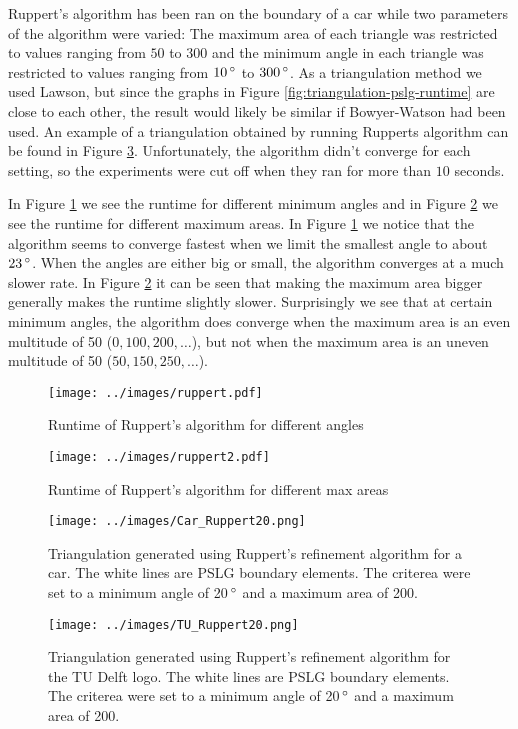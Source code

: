 Ruppert's algorithm has been ran on the boundary of a car while two parameters of the algorithm were varied:
The maximum area of each triangle was restricted to values ranging from $50$ to $300$ and
the minimum angle in each triangle was restricted to values ranging from $10\,^{\circ}$ to $300\,^{\circ}$.
As a triangulation method we used Lawson, but since the graphs in Figure \ref{fig:triangulation-pslg-runtime} are close to each other, the result would likely be similar if Bowyer-Watson had been used.
An example of a triangulation obtained by running Rupperts algorithm can be found in Figure \ref{fig:result_Car20}.
Unfortunately, the algorithm didn't converge for each setting, so the experiments were cut off when they ran for more than $10$ seconds.

In Figure \ref{fig:ruppert-runtime} we see the runtime for different minimum angles and in Figure \ref{fig:ruppert-runtime2} we see the runtime for different maximum areas.
In Figure \ref{fig:ruppert-runtime} we notice that the algorithm seems to converge fastest when we limit the smallest angle to about $23\,^{\circ}$.
When the angles are either big or small, the algorithm converges at a much slower rate.
In Figure \ref{fig:ruppert-runtime2} it can be seen that making the maximum area bigger generally makes the runtime slightly slower.
Surprisingly we see that at certain minimum angles, the algorithm does converge when the maximum area is an even multitude of 50 ($0, 100, 200, \ldots$), but not when the maximum area is an uneven multitude of 50 ($50, 150, 250, \ldots$).

\begin{figure}[ht]
    \centering
    \texttt{[image: ../images/ruppert.pdf]}
    \caption{Runtime of Ruppert's algorithm for different angles}
    \label{fig:ruppert-runtime}
\end{figure}

\begin{figure}[ht]
    \centering
    \texttt{[image: ../images/ruppert2.pdf]}
    \caption{Runtime of Ruppert's algorithm for different max areas}
    \label{fig:ruppert-runtime2}
\end{figure}

\begin{figure}
    \centering
    \texttt{[image: ../images/Car\_Ruppert20.png]}
    \caption{Triangulation generated using Ruppert's refinement algorithm for a car. The white lines are PSLG boundary elements.
    The criterea were set to a minimum angle of 20$\,^{\circ}$ and a maximum area of 200.}
    \label{fig:result_Car20}
\end{figure}

\begin{figure}
    \centering
    \texttt{[image: ../images/TU\_Ruppert20.png]}
    \caption{Triangulation generated using Ruppert's refinement algorithm for the TU Delft logo. The white lines are PSLG boundary elements.
    The criterea were set to a minimum angle of 20$\,^{\circ}$ and a maximum area of 200.}
    \label{fig:result_TU20}
\end{figure}

